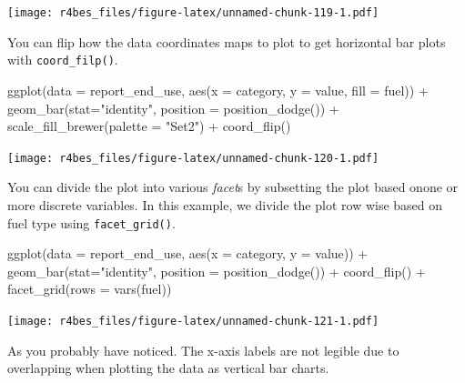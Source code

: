 \documentclass[
]{book}
\newenvironment{Shaded}{\begin{snugshade}}{\end{snugshade}}
\newcommand{\AttributeTok}[1]{\textcolor[rgb]{0.77,0.63,0.00}{#1}}
\newcommand{\FunctionTok}[1]{\textcolor[rgb]{0.00,0.00,0.00}{#1}}
\newcommand{\NormalTok}[1]{#1}
\newcommand{\SpecialCharTok}[1]{\textcolor[rgb]{0.00,0.00,0.00}{#1}}
\newcommand{\StringTok}[1]{\textcolor[rgb]{0.31,0.60,0.02}{#1}}
\begin{document}
\texttt{[image: r4bes\_files/figure-latex/unnamed-chunk-119-1.pdf]}

You can flip how the data coordinates maps to plot to get horizontal bar plots with \texttt{coord\_filp()}.

\begin{Shaded}
\begin{Highlighting}[]
\FunctionTok{ggplot}\NormalTok{(}\AttributeTok{data =}\NormalTok{ report\_end\_use, }\FunctionTok{aes}\NormalTok{(}\AttributeTok{x =}\NormalTok{ category, }\AttributeTok{y =}\NormalTok{ value, }\AttributeTok{fill =}\NormalTok{ fuel)) }\SpecialCharTok{+}
    \FunctionTok{geom\_bar}\NormalTok{(}\AttributeTok{stat=}\StringTok{"identity"}\NormalTok{, }\AttributeTok{position =} \FunctionTok{position\_dodge}\NormalTok{()) }\SpecialCharTok{+} 
    \FunctionTok{scale\_fill\_brewer}\NormalTok{(}\AttributeTok{palette =} \StringTok{"Set2"}\NormalTok{) }\SpecialCharTok{+}
    \FunctionTok{coord\_flip}\NormalTok{()}
\end{Highlighting}
\end{Shaded}

\texttt{[image: r4bes\_files/figure-latex/unnamed-chunk-120-1.pdf]}

You can divide the plot into various \emph{facet}s by subsetting the plot based onone or more discrete variables. In this example, we divide the plot row wise based on fuel type using \texttt{facet\_grid()}.

\begin{Shaded}
\begin{Highlighting}[]
\FunctionTok{ggplot}\NormalTok{(}\AttributeTok{data =}\NormalTok{ report\_end\_use, }\FunctionTok{aes}\NormalTok{(}\AttributeTok{x =}\NormalTok{ category, }\AttributeTok{y =}\NormalTok{ value)) }\SpecialCharTok{+}
    \FunctionTok{geom\_bar}\NormalTok{(}\AttributeTok{stat=}\StringTok{"identity"}\NormalTok{, }\AttributeTok{position =} \FunctionTok{position\_dodge}\NormalTok{()) }\SpecialCharTok{+} 
    \FunctionTok{coord\_flip}\NormalTok{() }\SpecialCharTok{+}
    \FunctionTok{facet\_grid}\NormalTok{(}\AttributeTok{rows =} \FunctionTok{vars}\NormalTok{(fuel))}
\end{Highlighting}
\end{Shaded}

\texttt{[image: r4bes\_files/figure-latex/unnamed-chunk-121-1.pdf]}

As you probably have noticed. The x-axis labels are not legible due to overlapping when plotting the data as vertical bar charts.
\end{document}
